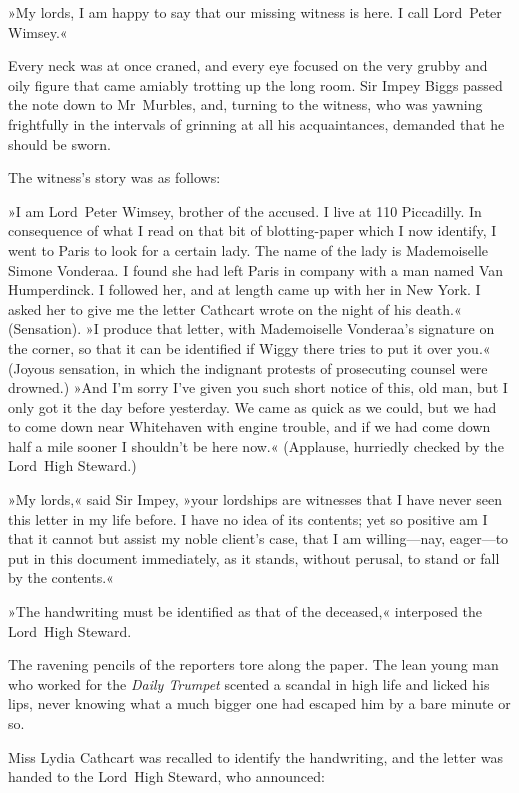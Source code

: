 »My lords, I am happy to say that our missing witness is here. I call Lord~Peter Wimsey.«

Every neck was at once craned, and every eye focused on the very grubby and oily figure that came amiably trotting up the long room. Sir Impey Biggs passed the note down to Mr~Murbles, and, turning to the witness, who was yawning frightfully in the intervals of grinning at all his acquaintances, demanded that he should be sworn.

The witness's story was as follows:

»I am Lord~Peter Wimsey, brother of the accused. I live at 110 Piccadilly. In consequence of what I read on that bit of blotting-paper which I now identify, I went to Paris to look for a certain lady. The name of the lady is Mademoiselle Simone Vonderaa. I found she had left Paris in company with a man named Van Humperdinck. I followed her, and at length came up with her in New York. I asked her to give me the letter Cathcart wrote on the night of his death.« (Sensation). »I produce that letter, with Mademoiselle Vonderaa's signature on the corner, so that it can be identified if Wiggy there tries to put it over you.« (Joyous sensation, in which the indignant protests of prosecuting counsel were drowned.) »And I'm sorry I've given you such short notice of this, old man, but I only got it the day before yesterday. We came as quick as we could, but we had to come down near Whitehaven with engine trouble, and if we had come down half a mile sooner I shouldn't be here now.« (Applause, hurriedly checked by the Lord~High Steward.)

»My lords,« said Sir Impey, »your lordships are witnesses that I have never seen this letter in my life before. I have no idea of its contents; yet so positive am I that it cannot but assist my noble client's case, that I am willing—nay, eager—to put in this document immediately, as it stands, without perusal, to stand or fall by the contents.«

»The handwriting must be identified as that of the deceased,« interposed the Lord~High Steward.

The ravening pencils of the reporters tore along the paper. The lean young man who worked for the \textit{Daily Trumpet} scented a scandal in high life and licked his lips, never knowing what a much bigger one had escaped him by a bare minute or so.

Miss Lydia Cathcart was recalled to identify the handwriting, and the letter was handed to the Lord~High Steward, who announced:

